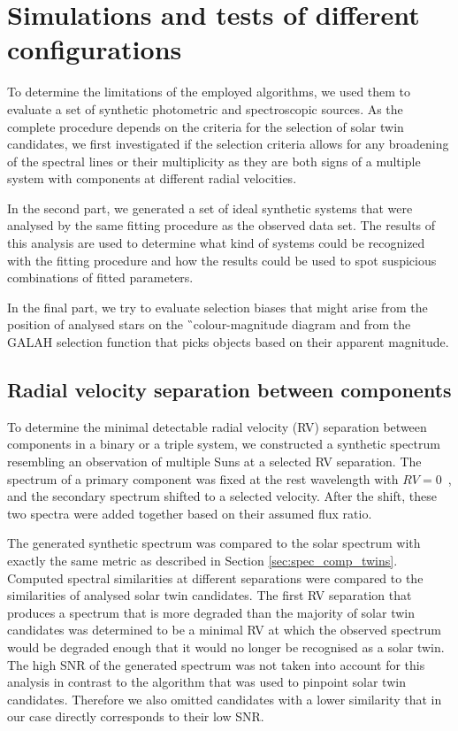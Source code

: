 \section{Simulations and tests of different configurations}
\label{sec:simulations}
To determine the limitations of the employed algorithms, we used them to evaluate a set of synthetic photometric and spectroscopic sources. As the complete procedure depends on the criteria for the selection of solar twin candidates, we first investigated if the selection criteria allows for any broadening of the spectral lines or their multiplicity as they are both signs of a multiple system with components at different radial velocities.

In the second part, we generated a set of ideal synthetic systems that were analysed by the same fitting procedure as the observed data set. The results of this analysis are used to determine what kind of systems could be recognized with the fitting procedure and how the results could be used to spot suspicious combinations of fitted parameters. 

In the final part, we try to evaluate selection biases that might arise from the position of analysed stars on the \G\ colour-magnitude diagram and from the GALAH selection function that picks objects based on their apparent magnitude.

\subsection{Radial velocity separation between components}
\label{sec:rv_sep_sim}
To determine the minimal detectable radial velocity (RV) separation between components in a binary or a triple system, we constructed a synthetic spectrum resembling an observation of multiple Suns at a selected RV separation. The spectrum of a primary component was fixed at the rest wavelength with $RV = 0$~\kms, and the secondary spectrum shifted to a selected velocity. After the shift, these two spectra were added together based on their assumed flux ratio. 

The generated synthetic spectrum was compared to the solar spectrum with exactly the same metric as described in Section \ref{sec:spec_comp_twins}. Computed spectral similarities at different separations were compared to the similarities of analysed solar twin candidates. The first RV separation that produces a spectrum that is more degraded than the majority of solar twin candidates was determined to be a minimal RV at which the observed spectrum would be degraded enough that it would no longer be recognised as a solar twin. The high SNR of the generated spectrum was not taken into account for this analysis in contrast to the algorithm that was used to pinpoint solar twin candidates. Therefore we also omitted candidates with a lower similarity that in our case directly corresponds to their low SNR. 

